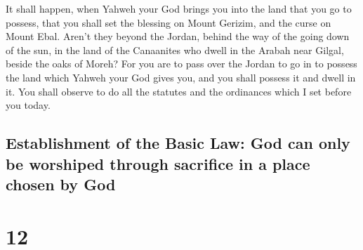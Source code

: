  It shall happen, when Yahweh your God brings you into
the land that you go to possess, that you shall set the blessing on
Mount Gerizim, and the curse on Mount Ebal.  Aren't they
beyond the Jordan, behind the way of the going down of the sun, in the
land of the Canaanites who dwell in the Arabah near Gilgal, beside the
oaks of Moreh?  For you are to pass over the Jordan to go
in to possess the land which Yahweh your God gives you, and you shall
possess it and dwell in it.  You shall observe to do all
the statutes and the ordinances which I set before you today.

\hypertarget{establishment-of-the-basic-law-god-can-only-be-worshiped-through-sacrifice-in-a-place-chosen-by-god}{%
\subsection{Establishment of the Basic Law: God can only be worshiped
through sacrifice in a place chosen by
God}\label{establishment-of-the-basic-law-god-can-only-be-worshiped-through-sacrifice-in-a-place-chosen-by-god}}

\hypertarget{section-11}{%
\section{12}\label{section-11}}

